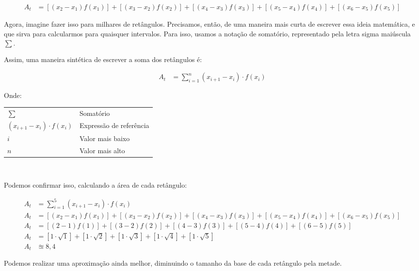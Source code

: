\documentclass[12pt,openright,twoside,a4paper]{article}
\makeatletter
\theoremstyle{definition}
\newenvironment{condicoes}[1][Onde:]
{#1 \begin{tabular}[t]{>{$}l<{$} @{${} \implies {}$} l}}
	{\end{tabular}\\[\belowdisplayskip]}
\makeatother
\begin{document}
	\begin{align*}
		A_t &= [(x_2 - x_1)f(x_1)] + [(x_3 - x_2)f(x_2)] + [(x_4 - x_3)f(x_3)] + [(x_5 - x_4)f(x_4)] + [(x_6 - x_5)f(x_5)]
	\end{align*}
	
	Agora, imagine fazer isso para milhares de retângulos. Precisamos, então, de uma maneira mais curta de escrever essa ideia matemática, e que sirva para calcularmos para quaisquer intervalos. Para isso, usamos a notação de somatório, representado pela letra sigma maiúscula $\sum$.
	
	Assim, uma maneira sintética de escrever a soma dos retângulos é:
	
	\begin{align*}
		A_t &= \sum_{i=1}^n (x_{i+1} - x_i) \cdot f(x_i)
	\end{align*}
	
	\begin{condicoes}
		\sum & Somatório\\
		(x_{i+1} - x_i) \cdot f(x_i) & Expressão de referência\\
		i & Valor mais baixo\\
		n & Valor mais alto
	\end{condicoes}
	
	Podemos confirmar isso, calculando a área de cada retângulo:
	
	\begin{align*}
		A_t &= \sum_{i=1}^5 (x_{i+1} - x_i) \cdot f(x_i)\\
		A_t &= [(x_2 - x_1)f(x_1)] + [(x_3 - x_2)f(x_2)] + [(x_4 - x_3)f(x_3)] + [(x_5 - x_4)f(x_4)] + [(x_6 - x_5)f(x_5)]\\
		A_t &= [(2-1)f(1)] + [(3 - 2)f(2)] + [(4 - 3)f(3)] + [(5 - 4)f(4)] + [(6 - 5)f(5)]\\
		A_t &= [1 \cdot \sqrt{1}] + [1 \cdot \sqrt{2}] + [1 \cdot \sqrt{3}] + [1 \cdot \sqrt{4}] + [1 \cdot \sqrt{5}]\\
		A_t &\approxeq 8,4
	\end{align*}
	
	Podemos realizar uma aproximação ainda melhor, diminuindo o tamanho da base de cada retângulo pela metade.
	
\end{document}
